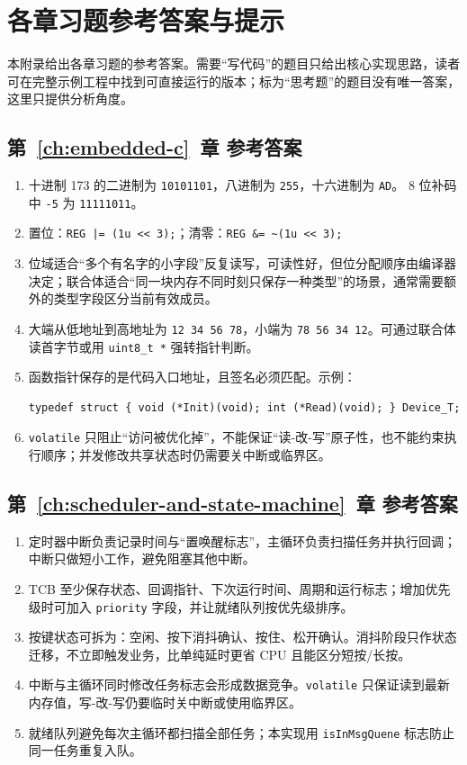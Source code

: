 \chapter{各章习题参考答案与提示}

本附录给出各章习题的参考答案。需要“写代码”的题目只给出核心实现思路，读者可在完整示例工程中找到可直接运行的版本；标为“思考题”的题目没有唯一答案，这里只提供分析角度。

\section*{第~\ref{ch:embedded-c}~章 参考答案}

\begin{enumerate}
	\item 十进制 173 的二进制为 \texttt{10101101}，八进制为 \texttt{255}，十六进制为 \texttt{AD}。
	8 位补码中 \texttt{-5} 为 \texttt{11111011}。
	\item 置位：\texttt{REG |= (1u << 3);}；清零：\texttt{REG \&= \textasciitilde(1u << 3);}
	\item 位域适合“多个有名字的小字段”反复读写，可读性好，但位分配顺序由编译器决定；联合体适合“同一块内存不同时刻只保存一种类型”的场景，通常需要额外的类型字段区分当前有效成员。
	\item 大端从低地址到高地址为 \texttt{12 34 56 78}，小端为 \texttt{78 56 34 12}。可通过联合体读首字节或用 \texttt{uint8\_t *} 强转指针判断。
	\item 函数指针保存的是代码入口地址，且签名必须匹配。示例：
	\begin{lstlisting}[style=c]
		typedef struct { void (*Init)(void); int (*Read)(void); } Device_T;
	\end{lstlisting}
	\item \texttt{volatile} 只阻止“访问被优化掉”，不能保证“读-改-写”原子性，也不能约束执行顺序；并发修改共享状态时仍需要关中断或临界区。
\end{enumerate}

\section*{第~\ref{ch:scheduler-and-state-machine}~章 参考答案}

\begin{enumerate}
	\item 定时器中断负责记录时间与“置唤醒标志”，主循环负责扫描任务并执行回调；中断只做短小工作，避免阻塞其他中断。
	\item TCB 至少保存状态、回调指针、下次运行时间、周期和运行标志；增加优先级时可加入 \texttt{priority} 字段，并让就绪队列按优先级排序。
	\item 按键状态可拆为：空闲、按下消抖确认、按住、松开确认。消抖阶段只作状态迁移，不立即触发业务，比单纯延时更省 CPU 且能区分短按/长按。
	\item 中断与主循环同时修改任务标志会形成数据竞争。\texttt{volatile} 只保证读到最新内存值，写-改-写仍要临时关中断或使用临界区。
	\item 就绪队列避免每次主循环都扫描全部任务；本实现用 \texttt{isInMsgQuene} 标志防止同一任务重复入队。
\end{enumerate}

